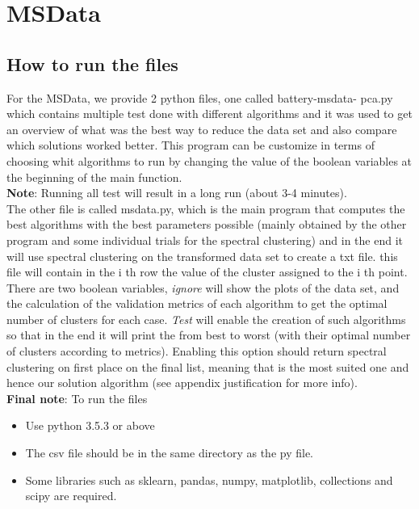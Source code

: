 \documentclass[12pt]{article}
\begin{document}
\section{MSData}
\subsection{How to run the files} \label{MSData:File}
For the MSData, we provide 2 python files, one called battery-msdata- pca.py which contains multiple test done with different algorithms and it was used to get an overview of what was the best way to reduce the data set and also compare which solutions worked better. This program can be customize in terms of choosing whit algorithms to run by changing the value of the boolean variables at the beginning of the main function. \\

\textbf{Note}: Running all test will result in a long run (about 3-4 minutes). \\

The other file is called msdata.py, which is the main program that computes the best algorithms with the best parameters possible (mainly obtained by the other program and some individual trials for the spectral clustering) and in the end it will use spectral clustering on the transformed data set to create a txt file. this file will contain in the i th row the value of the cluster assigned to the i th point. There are two boolean variables, \textit{ignore} will show the plots of the data set, and the calculation of the validation metrics of each algorithm to get the optimal number of clusters for each case. \textit{Test} will enable the creation of such algorithms so that in the end it will print the from best to worst (with their optimal number of clusters according to metrics). Enabling this option should return spectral clustering on first place on the final list, meaning that is the most suited one and hence our solution algorithm (see appendix justification for more info). \\ 

\textbf{Final note}: To run the files
\begin{itemize}
    \item Use python 3.5.3 or above
    \item The csv file should be in the same directory as the py file.
    \item Some libraries such as sklearn, pandas, numpy, matplotlib, collections and scipy are required.
\end{itemize} 
\end{document}
